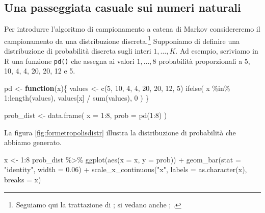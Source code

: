 \documentclass[
]{memoir}
\newenvironment{Shaded}{\begin{snugshade}}{\end{snugshade}}
\newcommand{\AttributeTok}[1]{\textcolor[rgb]{0.77,0.63,0.00}{#1}}
\newcommand{\ControlFlowTok}[1]{\textcolor[rgb]{0.13,0.29,0.53}{\textbf{#1}}}
\newcommand{\DecValTok}[1]{\textcolor[rgb]{0.00,0.00,0.81}{#1}}
\newcommand{\FloatTok}[1]{\textcolor[rgb]{0.00,0.00,0.81}{#1}}
\newcommand{\FunctionTok}[1]{\textcolor[rgb]{0.00,0.00,0.00}{#1}}
\newcommand{\NormalTok}[1]{#1}
\newcommand{\OtherTok}[1]{\textcolor[rgb]{0.56,0.35,0.01}{#1}}
\newcommand{\SpecialCharTok}[1]{\textcolor[rgb]{0.00,0.00,0.00}{#1}}
\newcommand{\StringTok}[1]{\textcolor[rgb]{0.31,0.60,0.02}{#1}}
\begin{document}
\hypertarget{una-passeggiata-casuale-sui-numeri-naturali}{%
\subsection{Una passeggiata casuale sui numeri naturali}\label{una-passeggiata-casuale-sui-numeri-naturali}}

Per introdurre l'algoritmo di campionamento a catena di Markov considereremo il campionamento da una distribuzione discreta.\footnote{Seguiamo qui la trattazione di \citet{albert2019probability}; si vedano anche \citet{doing_bayesian_data_an}; \citet{McElreath_rethinking}.} Supponiamo di definire una distribuzione di probabilità discreta sugli interi \(1,\dots, K\). Ad esempio, scriviamo in R una funzione \texttt{pd()} che assegna ai valori \(1,\dots, 8\) probabilità proporzionali a 5, 10, 4, 4, 20, 20, 12 e 5.

\begin{Shaded}
\begin{Highlighting}[]
\NormalTok{pd }\OtherTok{\textless{}{-}} \ControlFlowTok{function}\NormalTok{(x)\{}
\NormalTok{  values }\OtherTok{\textless{}{-}} \FunctionTok{c}\NormalTok{(}\DecValTok{5}\NormalTok{, }\DecValTok{10}\NormalTok{, }\DecValTok{4}\NormalTok{, }\DecValTok{4}\NormalTok{, }\DecValTok{20}\NormalTok{, }\DecValTok{20}\NormalTok{, }\DecValTok{12}\NormalTok{, }\DecValTok{5}\NormalTok{)}
  \FunctionTok{ifelse}\NormalTok{(}
\NormalTok{    x }\SpecialCharTok{\%in\%} \DecValTok{1}\SpecialCharTok{:}\FunctionTok{length}\NormalTok{(values),}
\NormalTok{    values[x] }\SpecialCharTok{/} \FunctionTok{sum}\NormalTok{(values),}
    \DecValTok{0}
\NormalTok{  )}
\NormalTok{\}}

\NormalTok{prob\_dist }\OtherTok{\textless{}{-}} \FunctionTok{data.frame}\NormalTok{(}
  \AttributeTok{x =} \DecValTok{1}\SpecialCharTok{:}\DecValTok{8}\NormalTok{,}
  \AttributeTok{prob =} \FunctionTok{pd}\NormalTok{(}\DecValTok{1}\SpecialCharTok{:}\DecValTok{8}\NormalTok{)}
\NormalTok{)}
\end{Highlighting}
\end{Shaded}

\noindent
La figura \ref{fig:formetropolisdistr} illustra la distribuzione di probabilità che abbiamo generato.

\begin{Shaded}
\begin{Highlighting}[]
\NormalTok{x }\OtherTok{\textless{}{-}} \DecValTok{1}\SpecialCharTok{:}\DecValTok{8}
\NormalTok{prob\_dist }\SpecialCharTok{\%\textgreater{}\%}
  \FunctionTok{ggplot}\NormalTok{(}\FunctionTok{aes}\NormalTok{(}\AttributeTok{x =}\NormalTok{ x, }\AttributeTok{y =}\NormalTok{ prob)) }\SpecialCharTok{+}
  \FunctionTok{geom\_bar}\NormalTok{(}\AttributeTok{stat =} \StringTok{"identity"}\NormalTok{, }\AttributeTok{width =} \FloatTok{0.06}\NormalTok{) }\SpecialCharTok{+}
  \FunctionTok{scale\_x\_continuous}\NormalTok{(}\StringTok{"x"}\NormalTok{, }\AttributeTok{labels =} \FunctionTok{as.character}\NormalTok{(x), }\AttributeTok{breaks =}\NormalTok{ x)}
\end{Highlighting}
\end{Shaded}
\end{document}

